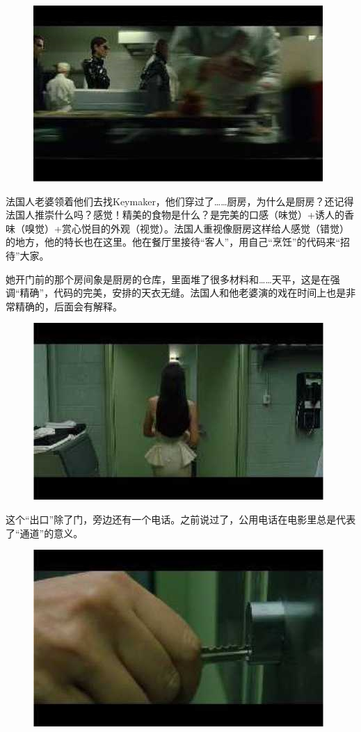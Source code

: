 \documentclass{ctexart}
\begin{document}
\begin{figure}[htb]
\centering
\includegraphics[width=0.5\linewidth]{fig/read_reloaded-108-1}
\end{figure}

法国人老婆领着他们去找Keymaker，他们穿过了……厨房，为什么是厨房？还记得法国人推崇什么吗？感觉！精美的食物是什么？是完美的口感（味觉）+诱人的香味（嗅觉）+赏心悦目的外观（视觉）。法国人重视像厨房这样给人感觉（错觉）的地方，他的特长也在这里。他在餐厅里接待“客人”，用自己“烹饪”的代码来“招待”大家。

她开门前的那个房间象是厨房的仓库，里面堆了很多材料和……天平，这是在强调“精确”，代码的完美，安排的天衣无缝。法国人和他老婆演的戏在时间上也是非常精确的，后面会有解释。

\begin{figure}[htb]
\centering
\includegraphics[width=0.5\linewidth]{fig/read_reloaded-109}
\end{figure}

这个“出口”除了门，旁边还有一个电话。之前说过了，公用电话在电影里总是代表了“通道”的意义。

\begin{figure}[htb]
\centering
\includegraphics[width=0.5\linewidth]{fig/read_reloaded-110}
\end{figure}
\end{document}
